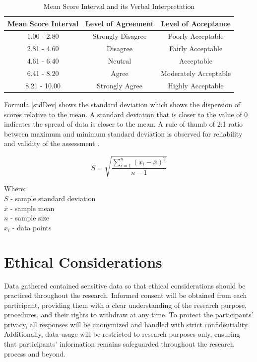 	\begin{table}[h]
		\centering
		\caption{Mean Score Interval and its Verbal Interpretation}
		\label{Verbal}
			\begin{tabular}{|c|c|c|}
				\hline
				\multicolumn{1}{|c|}{\textbf{Mean Score Interval}} & 
				\multicolumn{1}{c|}{\textbf{Level of Agreement}} & 
				\multicolumn{1}{c|}{\textbf{Level of Acceptance}} \\ \hline
				1.00 - 2.80   & Strongly Disagree   & Poorly Acceptable            \\ \hline
				2.81 - 4.60               & Disagree   & Fairly Acceptable  \\ \hline
				4.61 - 6.40           & Neutral   & Acceptable \\ \hline
				6.41 - 8.20            & Agree   & Moderately Acceptable      \\ \hline
				8.21 - 10.00               & Strongly Agree      & Highly Acceptable\\ \hline
			\end{tabular}
	\end{table}
	
	Formula \ref{stdDev} shows the standard deviation which shows the dispersion of scores relative to the mean. A standard deviation  that is closer to the value of 0 indicates the spread of data is closer to the mean.  A rule of thumb of 2:1 ratio between maximum and minimum standard deviation is observed for reliability and validity of the assessment \parencite{Yin2016}.
	
	\begin{equation} 
		\label{stdDev}
		S = \sqrt{\frac{\sum_{i=1}^{n} (x_{i} - \bar{x} )^2 }{n-1}}
	\end{equation}
	
	Where:
	\\$S$ - sample standard deviation
	\\$\bar{x}$ - sample mean
	\\$n$ - sample size
	\\$x_{i}$ - data points
	
	
	
	

\section{Ethical Considerations}
	Data gathered contained sensitive data so that ethical considerations should be practiced throughout the research.  Informed consent will be obtained from each participant, providing them with a clear understanding of the research purpose, procedures, and their rights to withdraw at any time. To protect the participants’ privacy, all responses will be anonymized and handled with strict confidentiality. Additionally, data usage will be restricted to research purposes only, ensuring that participants' information remains safeguarded throughout the research process and beyond. 
	
